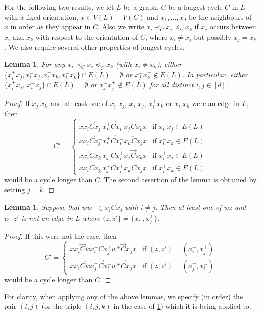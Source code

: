 \documentclass[12pt]{article}
\newtheorem{lem}[thm]{Lemma}
\theoremstyle{definition}
\newcommand{\ola}{\overleftarrow{C}}
\begin{document}
For the following two results, we let $L$ be a graph, $C$ be a longest cycle $C$ in $L$ with a fixed orientation, $x \in V(L)-V(C)$ and $x_1,\ldots, x_d$ be the neighbours of $x$ in order as they appear in $C$.
Also we write $x_i \prec_C x_j\preceq_C x_k$ if $x_j$ occurs between $x_i$ and $x_k$ with respect to the orientation of $C$, where $x_i \neq x_j$ but possibly $x_j=x_k$.
We also require several other properties of longest cycles.
\begin{lem}\label{l:common_arg}
For any $x_i\prec_C x_j \preceq_C x_k$ (with $x_i\neq x_k$), %
either
$\{x_i^+ x_j, x_i^- x_j, x_i^+ x_k, x_i^-x_k\}\cap E(L) = \emptyset$ or $x_j^- x_k^+ \notin E(L)$. 
In particular, either  $\{x_i^+ x_j$, $x_i^- x_j\}\cap E(L) = \emptyset$ or $x_j^- x_j^+ \notin E(L)$ for all distinct $i,j \in [d]$.
\end{lem} 
\begin{proof}
If  $x_j^- x_k^+$ and at least one of $x_i^+ x_j$, $x_i^- x_j$, $x_i^+ x_k$ or $x_i^- x_k$ were an edge in $L$, then 
\[
C' = 
\begin{cases}
x x_i \overrightarrow{C} x_j^- x_k^+ \overrightarrow{C}x_i^- x_j \overrightarrow{C} x_k x &\text{if }x_i^- x_j \in E(L)\\
x x_i \overrightarrow{C} x_j^- x_k^+ \overrightarrow{C}x_i^- x_k \ola x_j x &\text{if }x_i^- x_k \in E(L)\\
x x_i \overleftarrow{C} x_k^+ x_j^- \overleftarrow{C} x_i^+ x_j \overrightarrow{C} x_k x &\text{if }x_i^+ x_j \in E(L)\\
x x_i \overleftarrow{C} x_k^+ x_j^- \overleftarrow{C} x_i^+ x_k \overleftarrow{C} x_j x &\text{if }x_i^+ x_k \in E(L)
\end{cases}
\]
would be  a cycle longer than $C$. The second assertion of the lemma is obtained by setting $j=k$.
\end{proof}

\begin{lem}\label{l:nonXYedgesExtendCycle}
Suppose that $ww^+ \in x_i\overrightarrow{C}x_j$ with $i\neq j$. Then at least one of $wz$ and $w^+z'$ is not an edge in $L$ where $\{z,z'\}= \{x_i^-,x_j^+\}$.
\end{lem}
\begin{proof}
If this were not the case, then 
\[
C' = 
\begin{cases}
x x_i \overrightarrow{C} w x_i^- \overleftarrow{C} x_j^+ w^+ \overrightarrow{C} x_j x &\text{if } (z,z')=(x_i^-,x_j^+) \\
x x_i \overrightarrow{C} w x_j^+ \overrightarrow{C} x_i^- w^+ \overrightarrow{C} x_j x &\text{if } (z,z')=(x_j^+,x_i^-)
\end{cases}
\]
would be a cycle longer than $C$.
\end{proof}
For clarity, when applying any of the above lemmas, we specify (in order) the pair $(i,j)$ (or the triple $(i,j,k)$ in the case of \cref{l:common_arg}) which it is being applied to.
\end{document}
